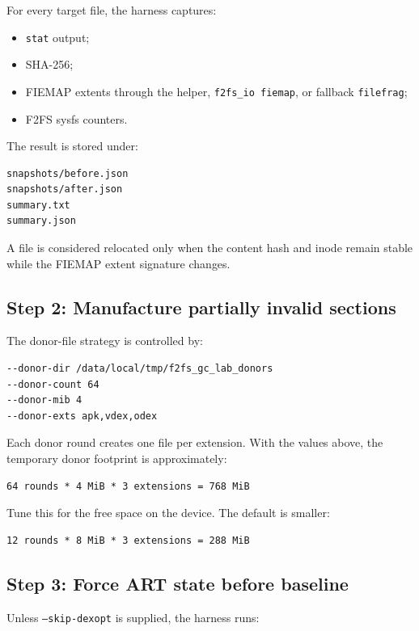 \documentclass[11pt]{article}
\begin{document}
For every target file, the harness captures:

\begin{itemize}[nosep]
\item \texttt{stat} output;
\item SHA-256;
\item FIEMAP extents through the helper, \texttt{f2fs\_io fiemap}, or fallback \texttt{filefrag};
\item F2FS sysfs counters.
\end{itemize}

The result is stored under:

\begin{verbatim}
snapshots/before.json
snapshots/after.json
summary.txt
summary.json
\end{verbatim}

A file is considered relocated only when the content hash and inode remain
stable while the FIEMAP extent signature changes.

\subsection{Step 2: Manufacture partially invalid sections}

The donor-file strategy is controlled by:

\begin{verbatim}
--donor-dir /data/local/tmp/f2fs_gc_lab_donors
--donor-count 64
--donor-mib 4
--donor-exts apk,vdex,odex
\end{verbatim}

Each donor round creates one file per extension.  With the values above, the
temporary donor footprint is approximately:

\begin{verbatim}
64 rounds * 4 MiB * 3 extensions = 768 MiB
\end{verbatim}

Tune this for the free space on the device.  The default is smaller:

\begin{verbatim}
12 rounds * 8 MiB * 3 extensions = 288 MiB
\end{verbatim}

\subsection{Step 3: Force ART state before baseline}

Unless \texttt{--skip-dexopt} is supplied, the harness runs:
\end{document}
